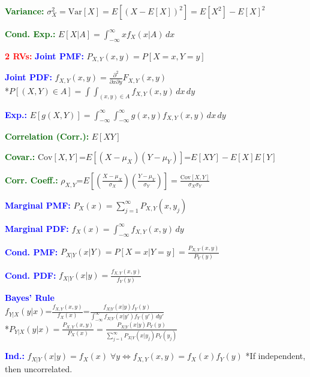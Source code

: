 \documentclass[5pt]{extarticle} %
\begin{document}
\begin{paracol}{3}
{    \textcolor{darkgreen}{\textbf{Variance:}} $\sigma_X^2 = \text{Var}[X] = E[(X - E[X])^2] = E[X^2] - E[X]^2$

    \textcolor{darkgreen}{\textbf{Cond. Exp.:}} $E[X|A] = \int_{-\infty}^{\infty} x f_X(x|A) \, dx$ 

    \textcolor{red}{\textbf{2 RVs:}}  \textcolor{blue}{\textbf{Joint PMF:}} $P_{X,Y}(x, y) = P[X = x, Y = y]$

    \textcolor{blue}{\textbf{Joint PDF:}} $f_{X,Y}(x, y) = \frac{\partial^2}{\partial x \partial y} F_{X,Y}(x, y)$ \\
    *$P[(X, Y) \in A] = \int \int_{(x, y) \in A} f_{X,Y}(x, y) \, dx \, dy$

    \textcolor{blue}{\textbf{Exp.:}} $E[g(X, Y)] = \int_{-\infty}^{\infty} \int_{-\infty}^{\infty} g(x, y) f_{X,Y}(x, y) \, dx \, dy$

    \textcolor{darkgreen}{\textbf{Correlation (Corr.):}} $E[XY]$

    \textcolor{darkgreen}{\textbf{Covar.:}} $\text{Cov}[X, Y] \text{=} E[(X - \mu_X)(Y - \mu_Y)] \text{=} E[XY] - E[X] E[Y]$

    \textcolor{darkgreen}{\textbf{Corr. Coeff.:}} $\rho_{X,Y} \text{=} E\left[ \left( \frac{X - \mu_X}{\sigma_X} \right) \left( \frac{Y - \mu_Y}{\sigma_Y} \right) \right] = \frac{\text{Cov}[X, Y]}{\sigma_X \sigma_Y}$

    \textcolor{blue}{\textbf{Marginal PMF:}} $P_X(x) = \sum_{j=1}^\infty P_{X,Y}(x, y_j)$

    \textcolor{blue}{\textbf{Marginal PDF:}} $f_X(x) = \int_{-\infty}^{\infty} f_{X,Y}(x, y) \, dy$

    \textcolor{blue}{\textbf{Cond. PMF:}} $P_{X|Y}(x|Y) = P[X = x|Y = y] = \frac{P_{X,Y}(x, y)}{P_Y(y)}$

    \textcolor{blue}{\textbf{Cond. PDF:}} $f_{X|Y}(x|y) = \frac{f_{X,Y}(x, y)}{f_Y(y)}$

    \textcolor{blue}{\textbf{Bayes' Rule}} \\ 
    $f_{Y|X}(y|x) \text{=} \frac{f_{X,Y} (x,y)}{f_X (x)} \text{=} \frac{f_{X|Y} (x|y) f_Y (y)}{\int_{-\infty}^{\infty} f_{X|Y} (x|y') f_Y (y') \, dy'}$ \\
    *$P_{Y|X}(y|x) = \frac{P_{X,Y}(x, y)}{P_X(x)} = \frac{P_{X|Y}(x|y) P_Y(y)}{\sum_{j=1}^\infty P_{X|Y}(x|y_j) P_Y(y_j)}$

    \textcolor{blue}{\textbf{Ind.:}} $f_{X|Y}(x|y) = f_X(x) \; \forall y \Leftrightarrow f_{X,Y}(x, y) = f_X(x) f_Y(y) $ 
    *If independent, then uncorrelated.

}
\end{paracol}
\end{document}
